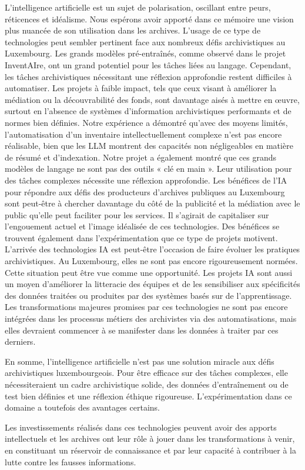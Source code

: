 L’intelligence artificielle est un sujet de polarisation, oscillant entre peurs, réticences et idéalisme. Nous espérons avoir apporté dans ce mémoire une vision plus nuancée de son utilisation dans les archives. L'usage de ce type de technologies peut sembler pertinent face aux nombreux défis archivistiques au Luxembourg. Les grands modèles pré-entraînés, comme observé dans le projet InventAIre, ont un grand potentiel pour les tâches liées au langage. Cependant, les tâches archivistiques nécessitant une réflexion approfondie restent difficiles à automatiser.
Les projets à faible impact, tels que ceux visant à améliorer la médiation ou la \gls{découvrabilité} des fonds, sont davantage aisés à mettre en œuvre, surtout en l'absence de systèmes d'information archivistiques performants et de normes bien définies. Notre expérience a démontré qu’avec des moyens limités, l’automatisation d’un inventaire intellectuellement complexe n’est pas encore réalisable, bien que les \gls{LLM} montrent des capacités non négligeables en matière de résumé et d’indexation.
Notre projet a également montré que ces grands modèles de langage ne sont pas des outils « clé en main ». Leur utilisation pour des tâches complexes nécessite une réflexion approfondie. Les bénéfices de l'IA pour répondre aux défis des producteurs d'archives publiques au Luxembourg sont peut-être à chercher davantage du côté de la publicité et la médiation avec le public qu'elle peut faciliter pour les services.
Il s'agirait de capitaliser sur l'engouement actuel et l'image idéalisée de 
ces technologies.
Des bénéfices se trouvent également dans l'expérimentation que ce type de projets
motivent. L'arrivée des technologies IA est peut-être l'occasion de faire évoluer les 
pratiques archivistiques.
Au Luxembourg, elles ne sont pas encore rigoureusement normées. Cette situation peut être vue comme une opportunité. Les projets IA sont aussi un moyen d’améliorer la  \gls{litteracie} des équipes et de les sensibiliser aux spécificités des données traitées ou produites par des systèmes basés sur de l'\gls{apprentissage}. Les transformations majeures promises par ces technologies ne sont pas encore intégrées dans les processus métiers des archivistes via des automatisations, mais elles devraient commencer 
à se manifester dans les données à traiter par ces derniers.

En somme, l’intelligence artificielle n’est pas une solution miracle aux défis archivistiques luxembourgeois. Pour être efficace sur des tâches complexes, elle nécessiteraient un cadre archivistique solide, des données d’entraînement ou de test bien définies et une réflexion éthique rigoureuse. L’expérimentation dans ce domaine a toutefois des avantages certains.

Les investissements réalisés dans ces technologies peuvent avoir des apports intellectuels et les archives ont leur rôle à jouer dans 
les transformations à venir, en constituant un réservoir de connaissance et par leur capacité à contribuer à la lutte contre 
les fausses informations.
